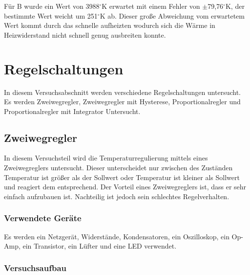 \documentclass[12pt,a4paper]{article}
\begin{document}
Für B wurde ein Wert von 3988$^\circ$K erwartet mit einem Fehler von $\pm$79,76$^\circ$K, der bestimmte Wert weicht um 251$^\circ$K ab. Dieser große Abweichung vom erwartetem Wert kommt durch das schnelle aufheizten wodurch sich die Wärme in Heizwiderstand nicht schnell genug ausbreiten konnte.





\section{Regelschaltungen}
In diesem Versuchsabschnitt werden verschiedene Regelschaltungen untersucht. Es werden Zweiwegregler, Zweiwegregler mit Hysterese, Proportionalregler und Proportionalregler mit Integrator Untersucht.

\subsection{Zweiwegregler}

In diesem Versuchsteil wird die Temperaturregulierung mittels eines Zweiwegreglers untersucht. Dieser unterscheidet nur zwischen des Zuständen Temperatur ist größer als der Sollwert oder Temperatur ist kleiner als Sollwert und reagiert dem entsprechend. Der Vorteil eines Zweiwegreglers ist, dass er sehr einfach aufzubauen ist. Nachteilig ist jedoch sein schlechtes Regelverhalten.

\subsubsection*{Verwendete Geräte}

Es werden ein Netzgerät, Widerstände, Kondensatoren, ein Oszilloskop, ein Op-Amp, ein Transistor, ein Lüfter und eine LED verwendet.


\subsubsection*{Versuchsaufbau}
\end{document}
